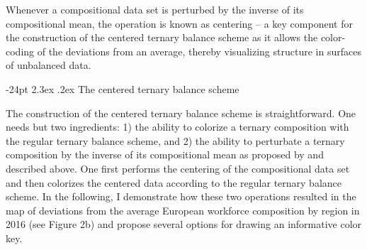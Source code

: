 \documentclass[10pt,twoside,reqno]{article}
\makeatletter
\renewcommand\section{\@startsection {section}{1}{\z@}%
                                   {-24pt}%
                                   {2.3ex \@plus.2ex}%
                                   {\normalfont\large\bfseries}}
\makeatother
\begin{document}
Whenever a compositional data set is perturbed by the inverse of its
compositional mean, the operation is known as centering -- a key
component for the construction of the centered ternary balance scheme as
it allows the color-coding of the deviations from an average, thereby
visualizing structure in surfaces of unbalanced data.

\hypertarget{the-centered-ternary-balance-scheme}{%
\section{The centered ternary balance
scheme}\label{the-centered-ternary-balance-scheme}}

The construction of the centered ternary balance scheme is
straightforward. One needs but two ingredients: 1) the ability to
colorize a ternary composition with the regular ternary balance scheme,
and 2) the ability to perturbate a ternary composition by the inverse of
its compositional mean as proposed by \citet{VonEynatten2002} and
described above. One first performs the centering of the compositional
data set and then colorizes the centered data according to the regular
ternary balance scheme. In the following, I demonstrate how these two
operations resulted in the map of deviations from the average European
workforce composition by region in 2016 (see Figure 2b) and propose
several options for drawing an informative color key.
\end{document}
